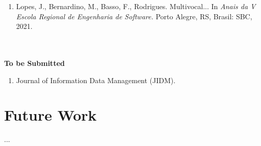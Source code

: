 \begin{enumerate}[label=\roman*.]
    \item Lopes, J., Bernardino, M., Basso, F., Rodrigues. Multivocal... In \textit{Anais da V Escola Regional de Engenharia de Software.} Porto Alegre, RS, Brasil: SBC, 2021.
\end{enumerate} 

\\~\\

\textbf{To be Submitted} 
    \begin{enumerate}[label=\roman*.]
        \item Journal of Information Data Management (JIDM).
    \end{enumerate} 

\section{Future Work}
...